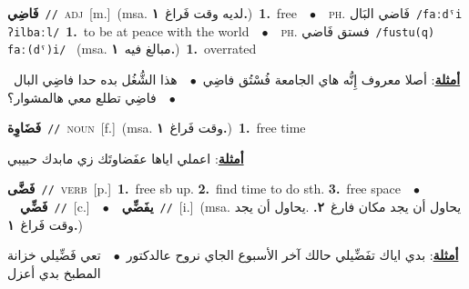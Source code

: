 \documentclass[10pt,a4paper,twoside]{article} %
\begin{document}
\begin{multicols}{2}
{\setlength\topsep{0pt}\textbf{\foreignlanguage{arabic}{فَاضِي}}\ {\color{gray}\texttt{//}\color{black}}\ \textsc{adj}\ [m.]\ \color{gray}(msa. \foreignlanguage{arabic}{لديه وقت فَراغ}~\foreignlanguage{arabic}{\textbf{١.}})\color{black}\ \textbf{1.}~free\ \ $\bullet$\ \ \textsc{ph.} \color{gray} \foreignlanguage{arabic}{فَاضي البَال}\color{black}\ {\color{gray}\texttt{/{\sffamily faːdˤi ʔilbaːl}/}\color{black}}\ \textbf{1.}~to be at peace with the world\ \ $\bullet$\ \ \textsc{ph.} \color{gray} \foreignlanguage{arabic}{فستق فَاضي}\color{black}\ {\color{gray}\texttt{/{\sffamily fustu(q) faː(dˤ)i}/}\color{black}}\ \color{gray} (msa. \foreignlanguage{arabic}{مبالغ فيه}~\foreignlanguage{arabic}{\textbf{١.}})\color{black}\ \textbf{1.}~overrated\  \begin{flushright}\color{gray}\foreignlanguage{arabic}{\textbf{\underline{\foreignlanguage{arabic}{أمثلة}}}: أصلا معروف إِنُّه هاي الجامعة فُسْتُق فاضِي\ $\bullet$\ \  هذا الشُّغُل بده حدا فاضِي البال\ $\bullet$\ \  فاضِي تطلع معي هالمشوار؟}\end{flushright}\color{black}} \vspace{2mm}

{\setlength\topsep{0pt}\textbf{\foreignlanguage{arabic}{فَضَاوِة}}\ {\color{gray}\texttt{//}\color{black}}\ \textsc{noun}\ [f.]\ \color{gray}(msa. \foreignlanguage{arabic}{وقت فَراغ}~\foreignlanguage{arabic}{\textbf{١.}})\color{black}\ \textbf{1.}~free time\  \begin{flushright}\color{gray}\foreignlanguage{arabic}{\textbf{\underline{\foreignlanguage{arabic}{أمثلة}}}: اعملي اياها عفَضاوتَك زي مابدك حبيبي}\end{flushright}\color{black}} \vspace{2mm}

{\setlength\topsep{0pt}\textbf{\foreignlanguage{arabic}{فَضَّى}}\ {\color{gray}\texttt{//}\color{black}}\ \textsc{verb}\ [p.]\ \textbf{1.}~free sb up.  \textbf{2.}~find time to do sth.  \textbf{3.}~free space\ \ $\bullet$\ \ \setlength\topsep{0pt}\textbf{\foreignlanguage{arabic}{فَضِّي}}\ {\color{gray}\texttt{//}\color{black}}\ [c.]\ \ $\bullet$\ \ \setlength\topsep{0pt}\textbf{\foreignlanguage{arabic}{يفَضِّي}}\ {\color{gray}\texttt{//}\color{black}}\ [i.]\ \color{gray}(msa. \foreignlanguage{arabic}{يحاول أن يجد مكان فارغ}~\foreignlanguage{arabic}{\textbf{٢.}}  .\foreignlanguage{arabic}{يحاول أن يجد وقت فَراغ}~\foreignlanguage{arabic}{\textbf{١.}})\color{black}\  \begin{flushright}\color{gray}\foreignlanguage{arabic}{\textbf{\underline{\foreignlanguage{arabic}{أمثلة}}}: بدي اياك تفَضِّيلي حالك آخر الأسبوع الجاي نروح عالدكتور\ $\bullet$\ \  تعي فَضِّيلي خزانة المطبخ بدي أعزل}\end{flushright}\color{black}} \vspace{2mm}


\end{multicols}
\end{document}
